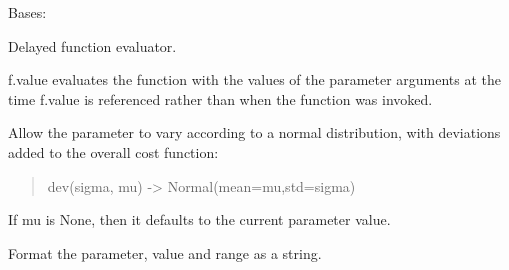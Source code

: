 \documentclass[letterpaper,10pt,english]{sphinxmanual}
\begin{document}

\begin{fulllineitems}
\label{api/mystic.parameter:refl1d.mystic.parameter.Function}
Bases: {\hyperref[api/mystic.parameter:refl1d.mystic.parameter.BaseParameter]{}}

Delayed function evaluator.

f.value evaluates the function with the values of the
parameter arguments at the time f.value is referenced rather
than when the function was invoked.

\begin{fulllineitems}
\label{api/mystic.parameter:refl1d.mystic.parameter.Function.args}
\end{fulllineitems}


\begin{fulllineitems}
\label{api/mystic.parameter:refl1d.mystic.parameter.Function.dev}
Allow the parameter to vary according to a normal distribution, with
deviations added to the overall cost function:
\begin{quote}

dev(sigma, mu) -\textgreater{} Normal(mean=mu,std=sigma)
\end{quote}

If mu is None, then it defaults to the current parameter value.

\end{fulllineitems}


\begin{fulllineitems}
\label{api/mystic.parameter:refl1d.mystic.parameter.Function.format}
Format the parameter, value and range as a string.

\end{fulllineitems}


\begin{fulllineitems}
\label{api/mystic.parameter:refl1d.mystic.parameter.Function.kw}
\end{fulllineitems}


\end{fulllineitems}
\end{document}
